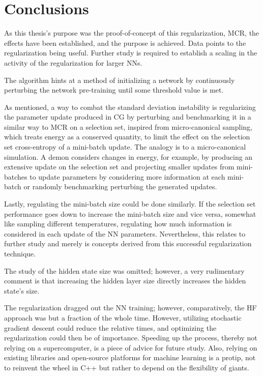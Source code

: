 \chapter{Conclusions}

As this thesis's purpose was the proof-of-concept of this regularization, MCR, the effects have been established, and the purpose is achieved. Data points to the regularization being useful. Further study is required to establish a scaling in the activity of the regularization for larger NNs.

The algorithm hints at a method of initializing a network by continuously perturbing the network pre-training until some threshold value is met. 

As mentioned, a way to combat the standard deviation instability is regularizing the parameter update produced in CG by perturbing and benchmarking it in a similar way to MCR on a selection set, inspired from micro-canonical sampling, which treats energy as a conserved quantity, to limit the effect on the selection set cross-entropy of a mini-batch update. The analogy is to a micro-canonical simulation. A demon considers changes in energy, for example, by producing an extensive update on the selection set and projecting smaller updates from mini-batches to update parameters by considering more information at each mini-batch or randomly benchmarking perturbing the generated updates.

Lastly, regulating the mini-batch size could be done similarly. If the selection set performance goes down to increase the mini-batch size and vice versa, somewhat like sampling different temperatures, regulating how much information is considered in each update of the NN parameters. Nevertheless, this relates to further study and merely is concepts derived from this successful regularization technique.

The study of the hidden state size was omitted; however, a very rudimentary comment is that increasing the hidden layer size directly increases the hidden state's size.

The regularization dragged out the NN training; however, comparatively, the HF approach was but a fraction of the whole time. However, utilizing stochastic gradient descent could reduce the relative times, and optimizing the regularization could then be of importance. Speeding up the process, thereby not relying on a supercomputer, is a piece of advice for future study. Also, relying on existing libraries and open-source platforms for machine learning is a protip, not to reinvent the wheel in C++ but rather to depend on the flexibility of giants.

